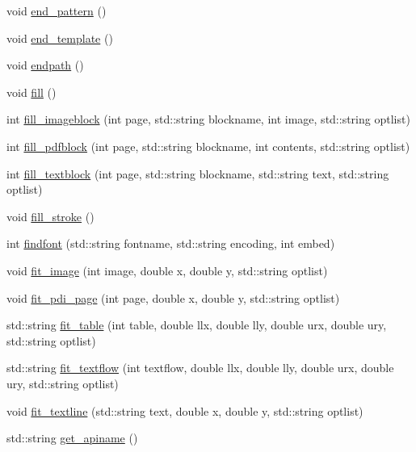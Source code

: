 \begin{DoxyCompactItemize}
\item 
void \hyperlink{classPDFlib_ac7a93102d044e6c8bd06d2a83c6b66f7}{end\+\_\+pattern} ()
\item 
void \hyperlink{classPDFlib_a67057f952266b4cbdd737b61a85090f7}{end\+\_\+template} ()
\item 
void \hyperlink{classPDFlib_a7d53283bf3787237ca080b1ee6897a26}{endpath} ()
\item 
void \hyperlink{classPDFlib_a0a698c3eb4f96ec63cf9636074fd7870}{fill} ()
\item 
int \hyperlink{classPDFlib_a584ee614b174cc35d99f0571227df21a}{fill\+\_\+imageblock} (int page, std\+::string blockname, int image, std\+::string optlist)
\item 
int \hyperlink{classPDFlib_af9c0c51770f3296907a630314f04dd03}{fill\+\_\+pdfblock} (int page, std\+::string blockname, int contents, std\+::string optlist)
\item 
int \hyperlink{classPDFlib_ad89aba96aa68737607b7c5f4f419bf33}{fill\+\_\+textblock} (int page, std\+::string blockname, std\+::string text, std\+::string optlist)
\item 
void \hyperlink{classPDFlib_af075d64fe8d704204883c548b7d48460}{fill\+\_\+stroke} ()
\item 
int \hyperlink{classPDFlib_a07e3c184619af04184b342136c97b30a}{findfont} (std\+::string fontname, std\+::string encoding, int embed)
\item 
void \hyperlink{classPDFlib_ae190bced58224501fce22ab778e7855b}{fit\+\_\+image} (int image, double x, double y, std\+::string optlist)
\item 
void \hyperlink{classPDFlib_aec960d2bb746ba340bcb0e275393aea4}{fit\+\_\+pdi\+\_\+page} (int page, double x, double y, std\+::string optlist)
\item 
std\+::string \hyperlink{classPDFlib_a8049e74f5bd6a63ed988dcbca887ea40}{fit\+\_\+table} (int table, double llx, double lly, double urx, double ury, std\+::string optlist)
\item 
std\+::string \hyperlink{classPDFlib_ad8d24aaccdc61e3f482594269e7db1de}{fit\+\_\+textflow} (int textflow, double llx, double lly, double urx, double ury, std\+::string optlist)
\item 
void \hyperlink{classPDFlib_ad451733ee7844848d649a1e1a551623c}{fit\+\_\+textline} (std\+::string text, double x, double y, std\+::string optlist)
\item 
std\+::string \hyperlink{classPDFlib_a84199831e344c9705e47ea184e92a650}{get\+\_\+apiname} ()
\item 

\end{DoxyCompactItemize}
